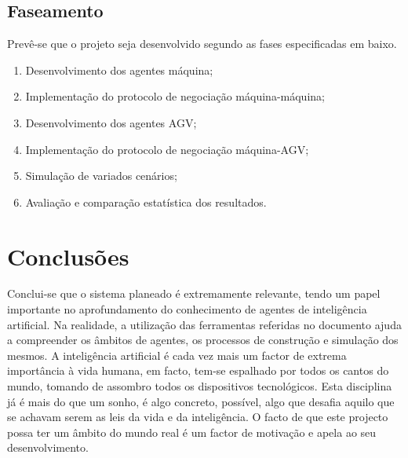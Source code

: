 \begin{titlepage}
\newpage
\subsection{Faseamento}
Prevê-se que o projeto seja desenvolvido segundo as fases especificadas em baixo.

\begin{enumerate}
\item Desenvolvimento dos agentes máquina;
\item Implementação do protocolo de negociação máquina-máquina;
\item Desenvolvimento dos agentes AGV;
\item Implementação do protocolo de negociação máquina-AGV;
\item Simulação de variados cenários;
\item Avaliação e comparação estatística dos resultados.
\end{enumerate}

\section{Conclusões}
\justify\normalsize
Conclui-se que o sistema planeado é extremamente relevante, tendo um papel importante no aprofundamento do conhecimento de agentes de inteligência artificial. Na realidade, a utilização das ferramentas referidas no documento ajuda a compreender os âmbitos de agentes, os processos de construção e simulação dos mesmos. A inteligência artificial é cada vez mais um factor de extrema importância à vida humana, em facto, tem-se espalhado por todos os cantos do mundo, tomando de assombro todos os dispositivos tecnológicos. Esta disciplina já é mais do que um sonho, é algo concreto, possível, algo que desafia aquilo que se achavam serem as leis da vida e da inteligência. O facto de que este projecto possa ter um âmbito do mundo real é um factor de motivação e apela ao seu desenvolvimento.

\nocite{*}



\end{titlepage}
